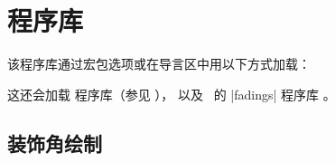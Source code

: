 \clearpage
\section{ 程序库}\label{sec:vignette}%
%
该程序库通过宏包选项或在导言区中用以下方式加载：
\begin{dispListing}
\end{dispListing}
这还会加载  程序库（参见 ），
以及 \tikzname\ 的 |fadings| 程序库 \cite{tantau:tikz_and_pgf}。


\subsection{装饰角绘制}\label{subsec:vignettedrawing}

